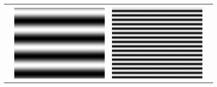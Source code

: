 \begin{figure}[H]
\begin{tabularx}{\textwidth}{p{}CCC}
        \vspace{.5em}                                                                                                     \\
        \begin{minipage}{.05\textwidth}
            \centering
        \end{minipage}                                                   &
        \begin{minipage}{.25\textwidth}
            \includegraphics[width=\textwidth,keepaspectratio]{../../Figures/08_21_img4.pdf}
        \end{minipage}  &
        \begin{minipage}{.25\textwidth}
            \includegraphics[width=\textwidth,keepaspectratio]{../../Figures/08_22_img16.pdf}

\end{minipage}
\end{tabularx}
\end{figure}
